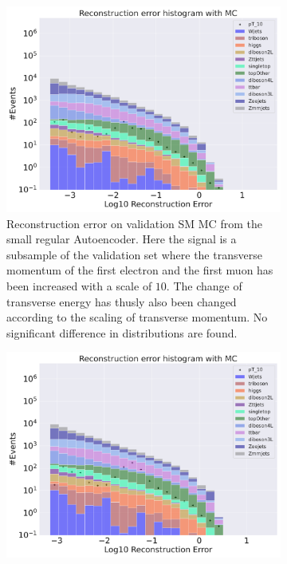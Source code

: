 \begin{figure}[h!]
    \centering
    \begin{subfigure}{.45\textwidth}
        \includegraphics[width=\textwidth]{Figures/AE_testing/small/b_data_recon_big_rm3_feats_sig_pT_10.pdf}
        \caption{Reconstruction error on validation SM MC from the small regular Autoencoder. Here the signal is a subsample of the validation 
        set where the transverse momentum of the first electron and the first muon has been increased with a scale of $10$. The change of transverse 
        energy has thusly also been changed according to the scaling of transverse momentum. No significant difference in distributions are found. }
        \label{fig:ae_small_pt_10}
    \end{subfigure}
    \hfill 
    \begin{subfigure}{.45\textwidth}
        \includegraphics[width=\textwidth]{Figures/AE_testing/big/b_data_recon_big_rm3_feats_sig_pT_10.pdf}

\end{subfigure}
\end{figure}
